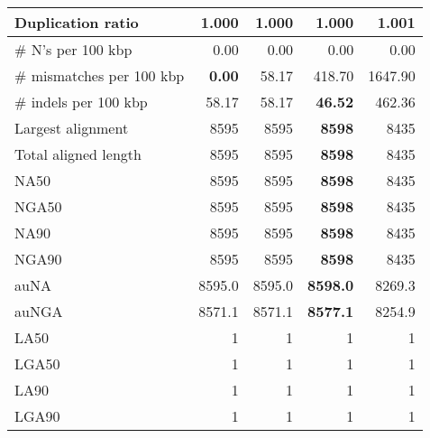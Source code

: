 \documentclass[12pt,a4paper]{article}
\begin{document}
\begin{table}[ht]
\begin{center}
\begin{tabular}{|l*{4}{|r}|}
Duplication ratio & {\bf 1.000} & {\bf 1.000} & {\bf 1.000} & 1.001 \\ \hline
\# N's per 100 kbp & 0.00 & 0.00 & 0.00 & 0.00 \\ \hline
\# mismatches per 100 kbp & {\bf 0.00} & 58.17 & 418.70 & 1647.90 \\ \hline
\# indels per 100 kbp & 58.17 & 58.17 & {\bf 46.52} & 462.36 \\ \hline
Largest alignment & 8595 & 8595 & {\bf 8598} & 8435 \\ \hline
Total aligned length & 8595 & 8595 & {\bf 8598} & 8435 \\ \hline
NA50 & 8595 & 8595 & {\bf 8598} & 8435 \\ \hline
NGA50 & 8595 & 8595 & {\bf 8598} & 8435 \\ \hline
NA90 & 8595 & 8595 & {\bf 8598} & 8435 \\ \hline
NGA90 & 8595 & 8595 & {\bf 8598} & 8435 \\ \hline
auNA & 8595.0 & 8595.0 & {\bf 8598.0} & 8269.3 \\ \hline
auNGA & 8571.1 & 8571.1 & {\bf 8577.1} & 8254.9 \\ \hline
LA50 & 1 & 1 & 1 & 1 \\ \hline
LGA50 & 1 & 1 & 1 & 1 \\ \hline
LA90 & 1 & 1 & 1 & 1 \\ \hline
LGA90 & 1 & 1 & 1 & 1 \\ \hline
\end{tabular}
\end{center}
\end{table}
\end{document}
